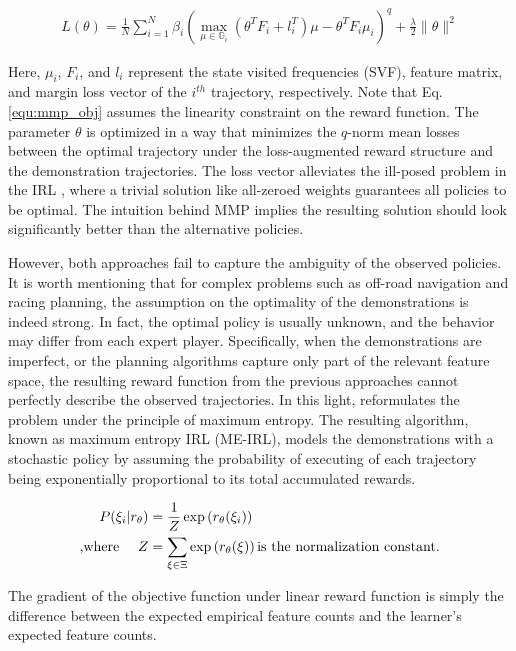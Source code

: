 \documentclass[../thesis.tex]{subfiles}
\begin{document}
\begin{align}
L(\theta) = \frac{1}{N} \sum^{N}_{i=1} \beta_i ( \max_{\mu \in \mathbb{G}_i}(\theta^T F_i + l_i^T)\mu - \theta^TF_i\mu_i )^q +  \frac{\lambda}{2} \| \theta \|^2 \label{equ:mmp_obj}
\end{align}

Here, $\mu_i$, $F_i$, and $l_i$ represent the state visited frequencies (SVF), feature matrix, and margin loss vector of the $i^{th}$ trajectory, respectively.
Note that Eq. \ref{equ:mmp_obj} assumes the linearity constraint on the reward function.
The parameter $\theta$ is optimized in a way that minimizes the $q$-norm mean losses between the optimal trajectory under the loss-augmented reward structure and the demonstration trajectories.
The loss vector alleviates the ill-posed problem in the IRL \cite{abbeel2004apprenticeship}, where a trivial solution like all-zeroed weights guarantees all policies to be optimal.
The intuition behind MMP implies the resulting solution should look significantly better than the alternative policies.
 
However, both approaches fail to capture the ambiguity of the observed policies.
It is worth mentioning that for complex problems such as off-road navigation and racing planning, the assumption on the optimality of the demonstrations is indeed strong. 
In fact, the optimal policy is usually unknown, and the behavior may differ from each expert player.
Specifically, when the demonstrations are imperfect, or the planning algorithms capture only part of the relevant feature space, the resulting reward function from the previous approaches cannot perfectly describe the observed trajectories.
In this light, \citet{ziebart2008maximum} reformulates the problem under the principle of maximum entropy.
The resulting algorithm, known as maximum entropy IRL (ME-IRL), models the demonstrations with a stochastic policy by assuming the probability of executing of each trajectory being exponentially proportional to its total accumulated rewards.

\begin{align}
P(\xi_i | r_\theta) &= \frac{1}{Z} \exp \left( r_\theta(\xi_i) \right) \\
\text{,where \quad} Z &= \sum_{\xi \in \Xi} \exp \left( r_\theta(\xi) \right) \text{is the normalization constant.}
\end{align}

The gradient of the objective function under linear reward function is simply the difference between the expected empirical feature counts and the learner's expected feature counts.
 
\end{document}
